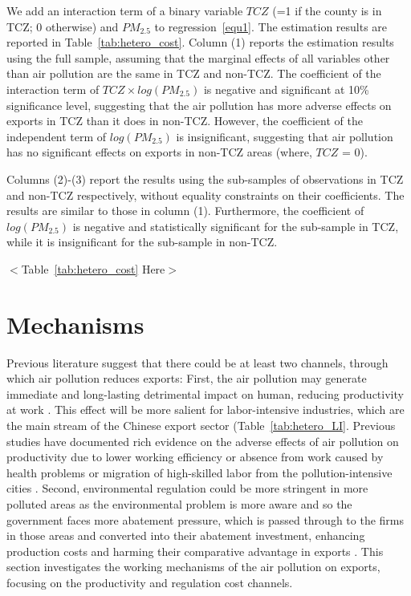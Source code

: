 \documentclass[12pt]{article}
\begin{document}
We add an interaction term of a binary variable $TCZ$ (=1 if the county is in TCZ; 0 otherwise) and $PM_{2.5}$ to regression~\ref{equ1}. The estimation results are reported in Table~\ref{tab:hetero_cost}. Column (1) reports the estimation results using the full sample, assuming that the marginal effects of all variables other than air pollution are the same in TCZ and non-TCZ. The coefficient of the interaction term of $TCZ \times log(PM_{2.5})$ is negative and significant at 10\% significance level, suggesting that the air pollution has more adverse effects on exports in TCZ than it does in non-TCZ. However, the coefficient of the independent term of $log(PM_{2.5})$ is insignificant, suggesting that air pollution has no significant effects on exports in non-TCZ areas (where, $TCZ$ = 0). 

Columns (2)-(3) report the results using the sub-samples of observations in TCZ and non-TCZ respectively, without equality constraints on their coefficients. The results are similar to those in column (1). Furthermore, the coefficient of $log(PM_{2.5})$ is negative and statistically significant for the sub-sample in TCZ, while it is insignificant for the sub-sample in non-TCZ. 
\begin{center}
  $<$Table~\ref{tab:hetero_cost} Here$>$
\end{center}

\section{Mechanisms}\label{sec:mechanism}
Previous literature suggest that there could be at least two channels, through which air pollution reduces exports: First, the air pollution may generate immediate and long-lasting detrimental impact on human, reducing productivity at work \citep{chang2016particulate,Adhvaryu2022,khanna2021productivity}. This effect will be more salient for labor-intensive industries, which are the main stream of the Chinese export sector (Table~\ref{tab:hetero_LI}. Previous studies have documented rich evidence on the adverse effects of air pollution on productivity due to lower working efficiency or absence from work caused by health problems \citep{fu2021air,somanathan2021impact}  or migration of high-skilled labor from the pollution-intensive cities \citep{khanna2021productivity}. Second, environmental regulation could be more stringent in more polluted areas as the environmental problem is more aware and so the government faces more abatement pressure, which is passed through to the firms in those areas and converted into their abatement investment, enhancing production costs and harming their comparative advantage in exports \citep{cherniwchan2022environmental,cherniwchan2022international}. This section investigates the working mechanisms of the air pollution on exports, focusing on the productivity and regulation cost channels.    
\end{document}
